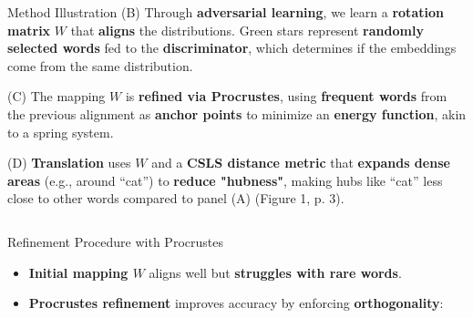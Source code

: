 \documentclass[final]{beamer}
\newlength{\onecolwid}
\newlength{\twocolwid}
\begin{document}
\begin{frame}[t]
\begin{columns}[t]
\begin{column}{\twocolwid}
\begin{block}{Method Illustration}
(B) Through \textbf{adversarial learning}, we learn a \textbf{rotation matrix} \(W\) that \textbf{aligns} the distributions. Green stars represent \textbf{randomly selected words} fed to the \textbf{discriminator}, which determines if the embeddings come from the same distribution. 

(C) The mapping \(W\) is \textbf{refined via Procrustes}, using \textbf{frequent words} from the previous alignment as \textbf{anchor points} to minimize an \textbf{energy function}, akin to a spring system. 

(D) \textbf{Translation} uses \(W\) and a \textbf{CSLS distance metric} that \textbf{expands dense areas} (e.g., around “cat”) to \textbf{reduce "hubness"}, making hubs like “cat” less close to other words compared to panel (A) (Figure 1, p. 3).

\normalsize
\end{block}

\begin{column}{\onecolwid}
	\begin{block}{Refinement Procedure with Procrustes}
	    \begin{itemize}
	        \item \textbf{Initial mapping \( W \)} aligns well but \textbf{struggles with rare words}.
	        \item \textbf{Procrustes refinement} improves accuracy by enforcing \textbf{orthogonality}:
	        

\end{itemize}
\end{block}
\end{column}
\end{column}
\end{columns}
\end{frame}
\end{document}

